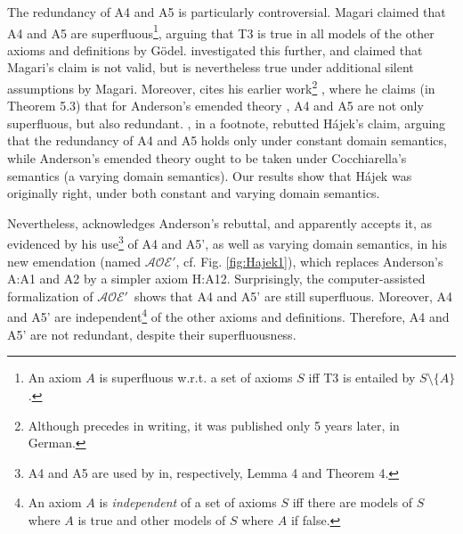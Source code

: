 \documentclass{birkjour}
\newcommand{\AOEH}{$\mathcal{AOE}'$}
\theoremstyle{definition}
\theoremstyle{remark}
\numberwithin{equation}{section}
\begin{document}
The redundancy of A4 and A5 is particularly controversial. Magari
\cite{Magari1988} claimed that A4 and A5 are superfluous\footnote{
An axiom $A$ is superfluous w.r.t. a set of axioms $S$ iff T3 is
entailed by $S \setminus \{ A \}$. }, arguing that T3 is true in all
models of the other axioms and definitions by Gödel.
\citet[p.~5-6]{Hajek_Magari_and_others_1996} investigated this
further, and claimed that Magari's claim is not valid, but is
nevertheless true  under additional silent assumptions by Magari.
Moreover, \citet[p.~2]{Hajek_Magari_and_others_1996} cites his earlier
work\footnote{Although \citep{Hajek_der_Mathematiker_2001} precedes
\citep{Hajek_Magari_and_others_1996} in writing, it was published only
5 years later, in German.} \citep{Hajek_der_Mathematiker_2001}, where
he claims (in Theorem 5.3) that for Anderson's emended theory
\citep{anderson90:_some_emend_of_goedel_ontol_proof}, A4 and A5 are
not only superfluous, but also redundant. \citet[footnote 1 in
p.~1]{AndersonGettings}, in a footnote, rebutted Hájek's claim,
arguing that the redundancy of A4 and A5 holds only under constant
domain semantics, while Anderson's emended theory ought to be taken
under Cocchiarella's semantics \citep{Cocchiarella} (a varying domain
semantics). Our results show that Hájek was originally right, under
both constant and varying domain semantics.

Nevertheless, \citet[p.~7]{Hajek2002} acknowledges Anderson's rebuttal,
and apparently accepts it, as evidenced by his use\footnote{
  A4 and A5 are used by \citet[p.~11]{Hajek2002} in,
  respectively, Lemma 4 and Theorem 4.
}
of A4 and A5', as well as varying domain semantics, in his new
emendation (named \AOEH \citep[sec.~4]{Hajek2002}, cf. Fig.
\ref{fig:Hajek1}), which replaces Anderson's A:A1 and A2 by a simpler
axiom H:A12. Surprisingly, the computer-assisted formalization of
\AOEH\ shows that A4 and A5' are still superfluous. Moreover,
A4 and A5' are independent\footnote{
  An axiom $A$ is \emph{independent} of a set of axioms $S$ iff
  there are models of $S$ where $A$ is true and other models of
  $S$ where $A$ if false.
}
of the other axioms and definitions.
Therefore, A4 and A5' are not redundant, despite their superfluousness.
\end{document}
